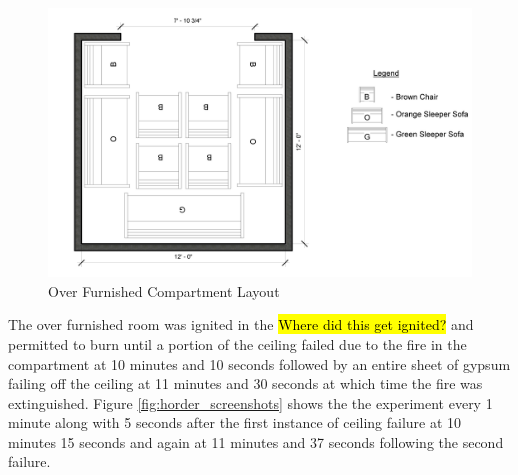 \documentclass{article}
\begin{document}
\begin{figure}[H]
	\centering
	\includegraphics[width=5in]{0_Images/Vent_Limited_Room/HorderRoom.jpg}
	\caption{Over Furnished Compartment Layout}
	\label{fig:horder_layout}
\end{figure}

The over furnished room was ignited in the \hl{Where did this get ignited?} and permitted to burn until a portion of the ceiling failed due to the fire in the compartment at 10 minutes and 10 seconds followed by an entire sheet of gypsum failing off the ceiling at 11 minutes and 30 seconds at which time the fire was extinguished. Figure \ref{fig:horder_screenshots} shows the the experiment every 1 minute along with 5 seconds after the first instance of ceiling failure at 10 minutes 15 seconds and again at 11 minutes and 37 seconds following the second failure.
\end{document}
